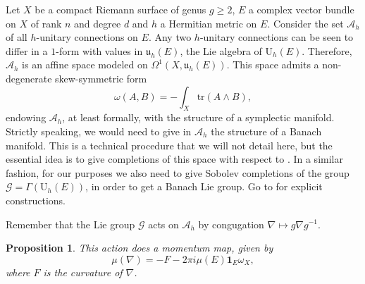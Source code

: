 \documentclass[12pt,a4paper]{book}
\newtheorem{prop}[thm]{Proposition}
\theoremstyle{definition} \newtheorem{defn}[thm]{Definition}
\theoremstyle{definition} \newtheorem{ejemplo}[thm]{Example}
\theoremstyle{remark} \newtheorem{rem}[thm]{Remark}
\def\AA{\mathscr{A}}
\def\GG{\mathscr{G}}
\def\tr{\mathrm{tr}}
\def\id{\mathbf{1}}
\def\UU{\mathrm{U}}
\def\uu{\mathfrak{u}}
\let\emph\relax
\begin{document}
Let $X$ be a compact Riemann surface of genus $g\geq 2$, $E$ a complex vector bundle on $X$ of rank $n$ and degree $d$ and $h$ a Hermitian metric on $E$. Consider the set $\AA_h$ of all $h$-unitary connections on $E$. Any two $h$-unitary connections can be seen to differ in a $1$-form with values in $\uu_h(E)$, the Lie algebra of $\UU_h(E)$. Therefore, $\AA_h$ is an affine space modeled on $\Omega^1(X,\uu_h(E))$. This space admits a non-degenerate skew-symmetric form
\begin{equation*}
  \omega(A,B)=-\int_X \tr(A\wedge B),
\end{equation*}
endowing $\AA_h$, at least formally, with the structure of a symplectic manifold. Strictly speaking, we would need to give in $\AA_h$ the structure of a Banach manifold. This is a technical procedure that we will not detail here, but the essential idea is to give completions of this space with respect to \emph{Sobolev norms}. In a similar fashion, for our purposes we also need to give Sobolev completions of the group $\GG=\Gamma(\UU_h(E))$, in order to get a Banach Lie group. Go to \cite{atiyahbott,kobayashi} for explicit constructions.

Remember that the Lie group $\GG$ acts on $\AA_h$ by congugation $\nabla\mapsto g\nabla g^{-1}$. 
\begin{prop}
  This action does a momentum map, given by
\begin{equation*}
  \mu(\nabla)=-F-2\pi i \mu(E) \id_E \omega_X,
\end{equation*}
where $F$ is the curvature of $\nabla$.
\end{prop}
\end{document}
